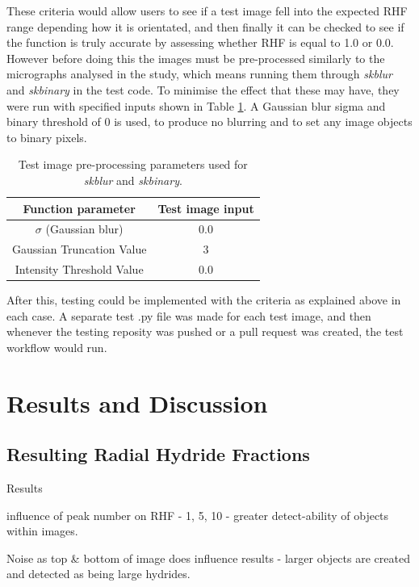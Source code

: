 \documentclass{article}
\begin{document}
    These criteria would allow users to see if a test image fell into the expected RHF range depending how it is orientated, and then finally it can be checked to see if the function is truly accurate by assessing whether RHF is equal to 1.0 or 0.0.  However before doing this the images must be pre-processed similarly to the micrographs analysed in the study, which means running them through \textit{skblur} and \textit{skbinary} in the test code. To minimise the effect that these may have, they were run with specified inputs shown in Table \ref{tab:TestImageTable}. A Gaussian blur sigma and binary threshold of 0 is used, to produce no blurring and to set any image objects to binary pixels.

    \begin{table}[h]
        \centering
        \begin{tabular}{|c|c|}
        \hline
            \textbf{Function parameter} & \textbf{Test image input}  \\
            \hline
            $\sigma$ (Gaussian blur) & 0.0 \\
            \hline
            Gaussian Truncation Value & 3 \\
            \hline
            Intensity Threshold Value & 0.0 \\ 
        \hline
        \end{tabular}
    \caption{Test image pre-processing parameters used for \textit{skblur} and \textit{skbinary}.}
    \label{tab:TestImageTable}
    \end{table}

    After this, testing could be implemented with the criteria as explained above in each case. A separate test .py file was made for each test image, and then whenever the testing reposity was pushed or a pull request was created, the test workflow would run.

\section{Results and Discussion}
\subsection{Resulting Radial Hydride Fractions}
Results

influence of peak number on RHF - 1, 5, 10 - greater detect-ability of objects within images.

Noise as top \& bottom of image does influence results - larger objects are created and detected as being large hydrides.
\end{document}
